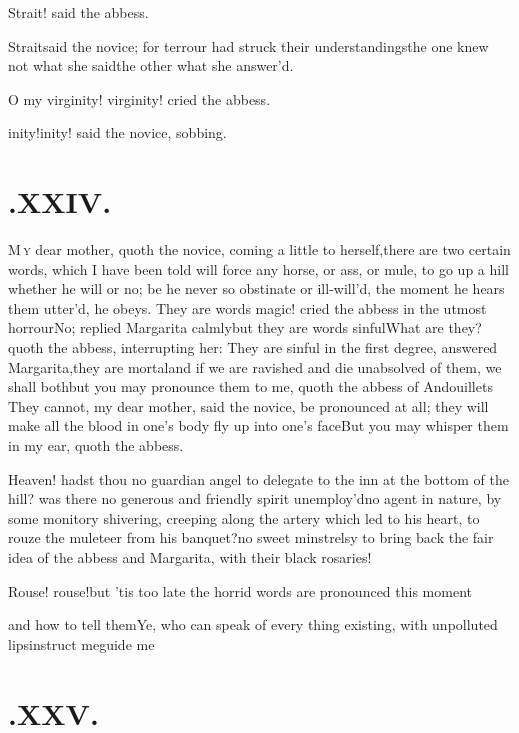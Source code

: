 \documentclass{article}
\begin{document}
\tsh Strait! said the abbess.

Strait\tsh said the novice; for terrour had struck their
understandings\tsh the one knew not what she
said\tsh the other what she answer’d.

O my virginity! virginity! cried the abbess.

\tsh inity!\tsh inity! said the novice,
sobbing.

\vfill{}\eject
\null\smallskip

\section{.\enspace XXIV.}

\lettrine{M}{\,y} dear mother, quoth the novice,
coming a little to herself,\tsh there are two certain words,
which I have been told will force any horse, or ass, or mule, to go
up a hill whether he will or no; be he never so obstinate or
ill-will’d, the moment he hears them utter’d, he obeys.
They are words magic! cried the abbess in the utmost
horrour\tsk No; replied Margarita calmly\tsk but they are
words sinful\tsk What are they? quoth the abbess, interrupting
her: They are sinful in the first degree, answered
Margarita,\break\tsk they are mortal\tsk and if we are
ravished and die unabsolved of them, we shall
both\tsh but you may pronounce them to me, quoth the
abbess of Andouillets\break
\tsh They cannot, my dear
mother, said the novice, be pronounced at all; they will make all
the blood in one’s body fly up into one’s
face\tsk But you may whisper them in my ear, quoth the
abbess.

Heaven! hadst thou no guardian angel to delegate to the inn at
the bottom of the hill? was there no generous and friendly spirit
unemploy’d\tsh no agent in nature, by some monitory
shivering, creeping along the artery which led to his heart, to
rouze the muleteer from his banquet?\tsh no sweet
minstrelsy to bring back the fair idea of the abbess and
Margarita, with their black rosaries!

Rouse! rouse!\tsh but ’tis too late\tsk\break
the horrid words are pronounced this moment\tsh{}

\tsh and how to tell them\tsk Ye, who can speak of
every thing existing, with unpolluted lips\tsk instruct
me\tsh guide me\tsh

\section{.\enspace XXV.}
\end{document}
